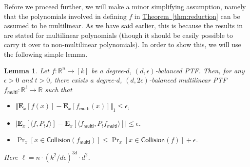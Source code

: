 \documentclass[11pt]{article}
\numberwithin{equation}{section}
\newtheorem{lemma}[theorem]{Lemma}
\theoremstyle{definition}
\theoremstyle{plain}
\newcommand{\expref}[2]{\hyperref[#2]{#1~\ref{#2}}}
\begin{document}
Before we proceed further, we will make a minor simplifying assumption, namely that the polynomials involved in defining $f$ in \expref{Theorem}{thm:reduction} can be assumed to be multilinear. As we have said earlier, this is because the results in~\cite{DS14} are stated for multilinear polynomials (though it should be easily possible to carry it over to non-multilinear polynomials). In order to show this, we will use the following simple lemma. 
\begin{lemma}\label{lem:multilinear} 
Let $f: \mathbb{R}^n \rightarrow [k]$ be a degree-$d$, $(d,\epsilon)$-balanced PTF\@. Then, for any $\epsilon>0$ and $t > 0$, there exists a degree-$d$, $(d,2\epsilon)$-balanced multilinear PTF $f_{\mathsf{multi}}: \mathbb{R}^\ell \rightarrow \mathbb{R}$ such that 
\begin{itemize}
\item $\Vert \mathbf{E}_{x } [f(x) ] - \mathbf{E}_{x } [f_{\mathsf{multi}}(x)  ] \Vert_1\le \epsilon$, 
\item $| \mathbf{E}_{x } [ \langle f, P_t  f \rangle ] - \mathbf{E}_{x } [\langle f_{\mathsf{multi}}, P_t f_{\mathsf{multi}}\rangle ] | \le \epsilon$.
\item $\Pr_{x } [x \in \mathsf{Collision}(f_{\mathsf{multi}})] \le \Pr_{x } [x \in \mathsf{Collision}(f)]  + \epsilon$.
\end{itemize}
Here $\ell = n \cdot (k^2/d \epsilon)^{3d} \cdot d^2$. 
\end{lemma}
\end{document}
